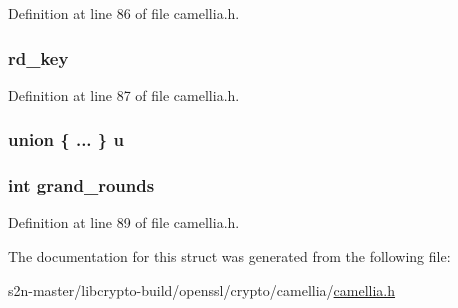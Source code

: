 Definition at line 86 of file camellia.\+h.

\subsubsection[{\texorpdfstring{rd\+\_\+key}{rd_key}}]{ rd\+\_\+key}\hypertarget{structcamellia__key__st_a7316710cc313afa3ef128d486e238461}{}\label{structcamellia__key__st_a7316710cc313afa3ef128d486e238461}


Definition at line 87 of file camellia.\+h.

\subsubsection[{\texorpdfstring{u}{u}}]{\setlength{\rightskip}{0pt plus 5cm}union \{ ... \}   u}\hypertarget{structcamellia__key__st_aac87cdaf20e59977c21432ee2143728d}{}\label{structcamellia__key__st_aac87cdaf20e59977c21432ee2143728d}
\subsubsection[{\texorpdfstring{grand\+\_\+rounds}{grand_rounds}}]{\setlength{\rightskip}{0pt plus 5cm}int grand\+\_\+rounds}\hypertarget{structcamellia__key__st_ab274b84127748d8091aec9f36392c17d}{}\label{structcamellia__key__st_ab274b84127748d8091aec9f36392c17d}


Definition at line 89 of file camellia.\+h.



The documentation for this struct was generated from the following file\+:\begin{DoxyCompactItemize}
\item 
s2n-\/master/libcrypto-\/build/openssl/crypto/camellia/\hyperlink{camellia_8h}{camellia.\+h}\end{DoxyCompactItemize}
